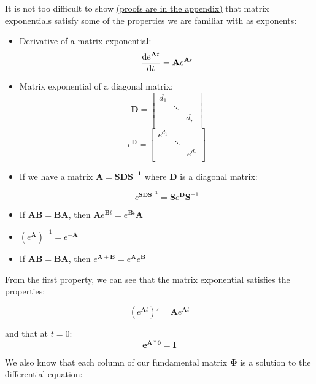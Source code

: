 \documentclass{report}
\begin{document}
It is not too difficult to show \hyperref[sec:prMatExpProp]{(proofs are in the appendix)} that matrix exponentials satisfy some of the properties we are familiar with as exponents:
\label{sec:matExpProp}
\begin{itemize}
    \item Derivative of a matrix exponential:
    $$\dv{e^{\mathbf{A}t}}{t}
    = \mathbf{A}e^{\mathbf{A}t}
    $$
    \item Matrix exponential of a diagonal matrix:
    $$
    \mathbf{D} = 
    \begin{bmatrix}
        d_{1} & & \\
        & \ddots & \\
        & & d_{r} \\
    \end{bmatrix}
    $$
    $$
    e^{\mathbf{D}} = 
    \begin{bmatrix}
        e^{d_{1}} & & \\
        & \ddots & \\
        & & e^{d_{r}} \\
    \end{bmatrix}
    $$
    \item If we have a matrix $\mathbf{A} = \mathbf{S}\mathbf{D}\mathbf{S^{-1}}$
    where $\mathbf{D}$ is a diagonal matrix:
    
    $$e^{\mathbf{\mathbf{S}\mathbf{D}\mathbf{S^{-1}}}} = \mathbf{S} e^{\mathbf{D}}\mathbf{S}^{-1}$$
    
    \item If $\mathbf{AB = BA}$, then $\mathbf{A}e^{\mathbf{B}t} = e^{\mathbf{B}t}\mathbf{A}$
    
    \item  $(e^{\mathbf{A}})^{-1} = e^{-\mathbf{A}}$

    \item If $\mathbf{AB = BA}$, then $e^{\mathbf{A+B}} = e^{\mathbf{A}}e^{\mathbf{B}}$
    
\end{itemize}


From the first property, we can see that the matrix exponential satisfies the properties:

$$(e^{\mathbf{A}t})' = \mathbf{A}e^{\mathbf{A}t}$$

and that at $t=0$:
$$\mathbf{e^{\mathbf{A}*0}} = \mathbf{I}$$


We also know that each column of our fundamental matrix $\mathbf{\Phi}$ is a solution to the differential equation:
\end{document}
